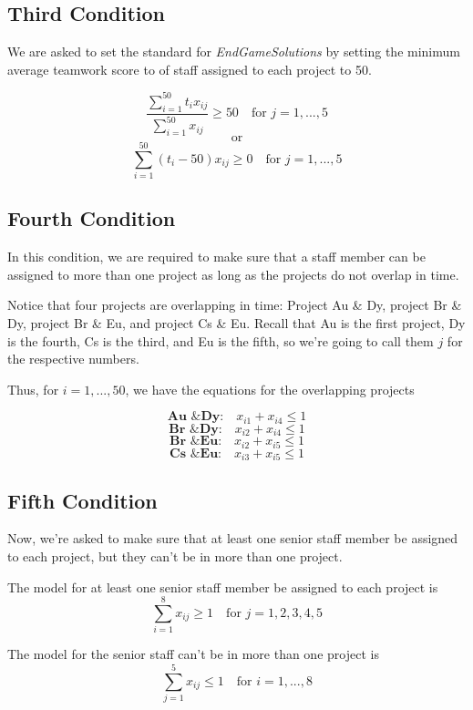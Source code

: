 \documentclass{article}
\begin{document}
\subsection{Third Condition}
We are asked to set the standard for \textit{EndGameSolutions} by setting the minimum average teamwork score to of staff assigned to each project to 50.

\[\frac{\sum_{i=1}^{50} t_ix_{ij}}{\sum_{i=1}^{50}x_{ij}} \ge 50 \hspace{1em}\text{for $j=1,...,5$}\]
\[\text{or}\]
\[\sum_{i=1}^{50} (t_i-50)x_{ij} \ge 0 \hspace{1em}\text{for $j=1,...,5$}\]

\subsection{Fourth Condition}
In this condition, we are required to make sure that a staff member can be assigned to more than one project as long as the projects do not overlap in time.

Notice that four projects are overlapping in time: Project Au \& Dy, project Br \& Dy, project Br \& Eu, and project Cs \& Eu. Recall that Au is the first project, Dy is the fourth, Cs is the third, and Eu is the fifth, so we're going to call them $j$ for the respective numbers. 

Thus, for $i = 1,...,50$, we have the equations for the overlapping projects

\[\textbf{Au \& Dy:}\hspace{1em} x_{i1} + x_{i4} \le 1\]
\[\textbf{Br \& Dy:}\hspace{1em} x_{i2} + x_{i4} \le 1\]
\[\textbf{Br \& Eu:}\hspace{1em} x_{i2} + x_{i5} \le 1\]
\[\textbf{Cs \& Eu:}\hspace{1em} x_{i3} + x_{i5} \le 1\]


\subsection{Fifth Condition}
Now, we're asked to make sure that at least one senior staff member be assigned to each project, but they can't be in more than one project.

The model for at least one senior staff member be assigned to each project is
\[\sum_{i=1}^{8} x_{ij} \ge 1 \hspace{1em}\text{for $j = 1,2,3,4,5$}\]

The model for the senior staff can't be in more than one project is
\[\sum_{j=1}^{5} x_{ij} \le 1 \hspace{1em}\text{for $i=1,...,8$}\]
\end{document}

